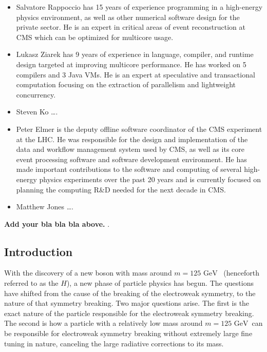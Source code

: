 \documentclass[12pt]{article}
\newcommand{\GeV}{\ensuremath{\mathrm{GeV}}}
\begin{document}
\begin{itemize}
\item Salvatore Rappoccio has 15 years of experience programming in a
high-energy physics environment, as well as other numerical software
design for the private sector. He is an expert in critical
areas of event reconstruction at CMS which can be optimized for
multicore usage. 
\item Lukasz Ziarek has 9 years of experience in language, compiler, and runtime design
targeted at improving multicore performance.  He has worked on 5 compilers and 3 Java VMs. He
is an expert at speculative and transactional computation focusing on the extraction of
parallelism and lightweight concurrency.
\item Steven Ko \ldots. 
\item Peter Elmer is the deputy offline software coordinator of the CMS
experiment at the LHC. He was responsible for the design and implementation
of the data and workflow management system used by CMS, as well as its core
event processing software and software development environment. He has
made important contributions to the software and computing of several 
high-energy physics experiments over the past 20 years and is currently
focused on planning the computing R\&D needed for the next decade in CMS.
\item Matthew Jones \ldots.  
\end{itemize}




\bigskip

{\bf Add your bla bla bla above. }. 


\clearpage

\subsection{Introduction}

With the discovery of a new boson with mass around $m=125$
\GeV ~\cite{higgs_cms,higgs_atlas} (henceforth referred to as the
$H$), a new phase of particle physics
has begun. The questions have shifted from the cause of the breaking
of the electroweak symmetry, to the nature of that symmetry
breaking. Two major questions arise. The first is the exact nature of
the particle responsible for the electroweak symmetry breaking. The
second is how a particle with a relatively low mass around $m=125$ \GeV\ 
can be responsible for electroweak symmetry breaking 
without extremely large fine tuning in nature, canceling
the large radiative corrections to its mass. 
\end{document}
